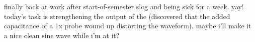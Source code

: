 finally back at work after start-of-semester slog and being sick for a week.
yay! today's task is strengthening the output of the \pll (discovered that the
added capacitance of a 1x probe wound up distorting the waveform). maybe i'll
make it a nice clean sine wave while i'm at it?
